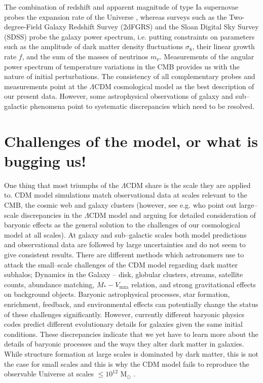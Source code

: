 \documentclass[a4wide,12pt]{book}
\begin{document}
The combination of redshift and apparent magnitude of type Ia supernovae probes the expansion rate of the Universe \citep[][]{Riess+1998, Perlmutter+1999}, whereas surveys such as the Two-degree-Field Galaxy Redshift Survey (2dFGRS) \citep[][]{2dFGRS} and the Sloan Digital Sky Survey (SDSS) \citep[][]{SDSS} probe the galaxy power spectrum, i.e. putting constraints on parameters such as the amplitude of dark matter density fluctuations $\sigma_8$, their linear growth rate $f$, and the sum of the masses of neutrinos $m_\nu$. Measurements of the angular power spectrum of temperature variations in the CMB \citep[COBE, WMAP, Planck][]{} provides us with the nature of initial perturbations. The consistency of all complementary probes and measurements point at the $\Lambda$CDM cosmological model as the best description of our present data. However, some astrophysical observations of galaxy and sub--galactic phenomena point to systematic discrepancies which need to be resolved.

\section{Challenges of the model, or what is bugging us!}
\label{subsec:LCDM_challenges}
One thing that most triumphs of the $\Lambda$CDM share is the scale they are applied to. CDM model simulations match observational data at scales relevant to the CMB, the cosmic web and galaxy clusters (however, see e.g. \citealt{Guo+2011} who point out large--scale discrepancies in the $\Lambda$CDM model and arguing for detailed consideration of baryonic effects as the general solution to the challenges of our cosmological model at all scales). At galaxy and sub--galactic scales both model predictions and observational data are followed by large uncertainties and do not seem to give consistent results. There are different methods which astronomers use to attack the small--scale challenges of the CDM model regarding dark matter subhalos; Dynamics in the Galaxy -- disk, globular clusters, streams, satellite counts, abundance matching, $M_* - V_\mathrm{mxa}$ relation, and strong gravitational effects on background objects. Baryonic astrophysical processes, star formation, enrichment, feedback, and environmental effects can potentially change the status of these challenges significantly. However, currently different baryonic physics codes predict different evolutionary details for galaxies given the same initial conditions. These discrepancies indicate that we yet have to learn more about the details of baryonic processes and the ways they alter dark matter in galaxies. While structure formation at large scales is dominated by dark matter, this is not the case for small scales and this is why the CDM model fails to reproduce the observable Universe at scales $\leq 10^{12} $ $\mathrm{M}_{\odot} $ .
\end{document}
